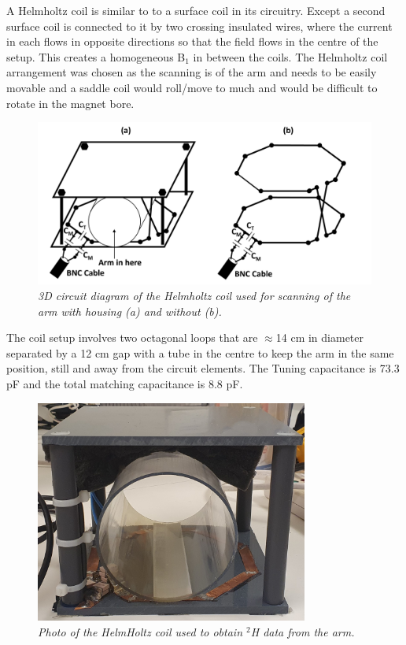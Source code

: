 A Helmholtz coil is similar to to a surface coil in its circuitry. Except a second surface coil is connected to it by two crossing insulated wires, where the current in each flows in opposite directions so that the field flows in the centre of the setup. This creates a homogeneous B$_1$ in between the coils. The Helmholtz coil arrangement was chosen as the scanning is of the arm and needs to be easily movable and a saddle coil would roll/move to much and would be difficult to rotate in the magnet bore.

\begin{figure}
    \centering
    \includegraphics[width=1\textwidth]{Figures/Theory/3D_Helmholtz.png}
    \caption{\textit{3D circuit diagram of the Helmholtz coil used for scanning of the arm with housing (a) and without (b).}}
    \label{fig:theory:3D_Helmholtz}
\end{figure}

The coil setup involves two octagonal loops that are $\approx$14 cm in diameter separated by a 12 cm gap with a tube in the centre to keep the arm in the same position, still and away from the circuit elements. The Tuning capacitance is 73.3 pF and the total matching capacitance is 8.8 pF.

\begin{figure}
    \centering
    \includegraphics[width=0.8\textwidth]{Figures/Theory/HelmHoltz_Coil.jpg}
    \caption{\textit{Photo of the HelmHoltz coil used to obtain $^2$H data from the arm.}}
    \label{fig:theory:HelmHoltz_pic}
\end{figure}